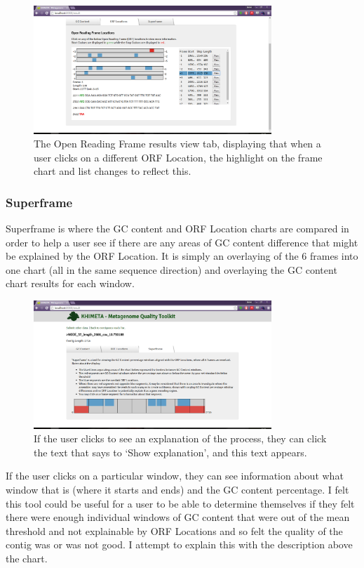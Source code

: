 \begin{figure}[H]
	\centering
\includegraphics[width=0.8\textwidth]{images/ui7}
\caption{The Open Reading Frame results view tab, displaying that when a user clicks on a different ORF Location, the highlight on the frame chart and list changes to reflect this.}
\end{figure}

\subsubsection{Superframe}
Superframe is where the GC content and ORF Location charts are compared in order to help a user see if there are any areas of GC content difference that might be explained by the ORF Location. It is simply an overlaying of the 6 frames into one chart (all in the same sequence direction) and overlaying the GC content chart results for each window.

\begin{figure}[H]
	\centering
\includegraphics[width=0.8\textwidth]{images/ui8}
\caption{If the user clicks to see an explanation of the process, they can click the text that says to `Show explanation', and this text appears.}
\end{figure}

If the user clicks on a particular window, they can see information about what window that is (where it starts and ends) and the GC content percentage. I felt this tool could be useful for a user to be able to determine themselves if they felt there were enough individual windows of GC content that were out of the mean threshold and not explainable by ORF Locations and so felt the quality of the contig was or was not good. I attempt to explain this with the description above the chart.

